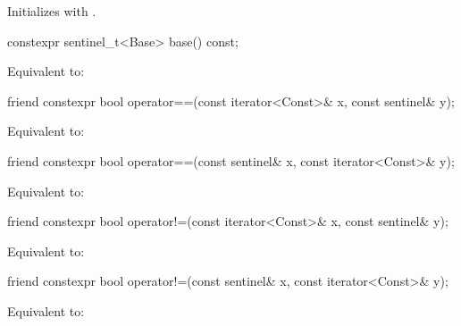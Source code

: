 \begin{itemdescr}
\pnum
\effects Initializes  with .
\end{itemdescr}

\begin{itemdecl}
constexpr sentinel_t<Base> base() const;
\end{itemdecl}

\begin{itemdescr}
\pnum
\effects Equivalent to: 
\end{itemdescr}

\begin{itemdecl}
friend constexpr bool operator==(const iterator<Const>& x, const sentinel& y);
\end{itemdecl}

\begin{itemdescr}
\pnum
\effects Equivalent to: 
\end{itemdescr}

\begin{itemdecl}
friend constexpr bool operator==(const sentinel& x, const iterator<Const>& y);
\end{itemdecl}

\begin{itemdescr}
\pnum
\effects Equivalent to: 
\end{itemdescr}

%
\begin{itemdecl}
friend constexpr bool operator!=(const iterator<Const>& x, const sentinel& y);
\end{itemdecl}

\begin{itemdescr}
\pnum
\effects Equivalent to: 
\end{itemdescr}

%
\begin{itemdecl}
friend constexpr bool operator!=(const sentinel& x, const iterator<Const>& y);
\end{itemdecl}

\begin{itemdescr}
\pnum
\effects Equivalent to: 
\end{itemdescr}

